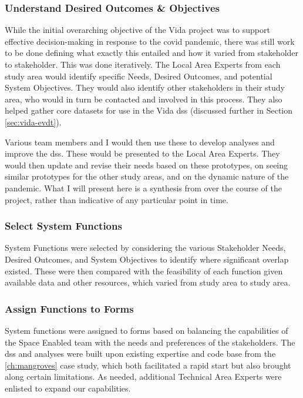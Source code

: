 \subsubsection{Understand Desired Outcomes \& Objectives}

While the initial overarching objective of the Vida project was to support effective decision-making in response to the \ac{covid} pandemic, there was still work to be done defining what exactly this entailed and how it varied from stakeholder to stakeholder. This was done iteratively. The Local Area Experts from each study area would identify specific Needs, Desired Outcomes, and potential System Objectives. They would also identify other stakeholders in their study area, who would in turn be contacted and involved in this process. They also helped gather core datasets for use in the Vida \ac{dss} (discussed further in Section \ref{sec:vida-evdt}). 

Various team members and I would then use these to develop analyses and improve the \ac{dss}. These would be presented to the Local Area Experts. They would then update and revise their needs based on these prototypes, on seeing similar prototypes for the other study areas, and on the dynamic nature of the pandemic. What I will present here is a synthesis from over the course of the project, rather than indicative of any particular point in time.

\subsubsection{Select System Functions}

System Functions were selected by considering the various Stakeholder Needs, Desired Outcomes, and System Objectives to identify where significant overlap existed. These were then compared with the feasibility of each function given available data and other resources, which varied from study area to study area. 

\subsubsection{Assign Functions to Forms}

System functions were assigned to forms based on balancing the capabilities of the Space Enabled team with the needs and preferences of the stakeholders. The \ac{dss} and analyses were built upon existing expertise and code base from the \ref{ch:mangroves} case study, which both facilitated a rapid start but also brought along certain limitations. As needed, additional Technical Area Experts were enlisted to expand our capabilities. 

